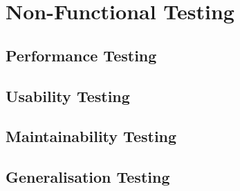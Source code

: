 \section{Non-Functional Testing}

\subsection{Performance Testing}

\subsection{Usability Testing}

\subsection{Maintainability Testing}

\subsection{Generalisation Testing}